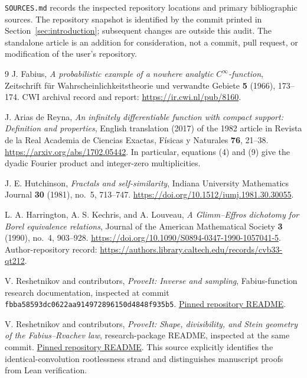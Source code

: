 \documentclass[11pt,a4paper]{article}
\theoremstyle{definition}
\theoremstyle{remark}
\newcommand{\sourcecommit}{\texttt{fbba58593dc0622aa914972896150d4848f935b5}}
\begin{document}
\texttt{SOURCES.md} records the inspected repository locations and primary
bibliographic sources. The repository snapshot is identified by the commit
printed in Section~\ref{sec:introduction}; subsequent changes are outside
this audit. The standalone article is an addition for consideration, not
a commit, pull request, or modification of the user's repository.

\begingroup
\small
\setlength{\parskip}{0pt}
\begin{thebibliography}{9}
J. Fabius,
\emph{A probabilistic example of a nowhere analytic $C^\infty$-function},
Zeitschrift f\"ur Wahrscheinlichkeitstheorie und verwandte Gebiete
\textbf{5} (1966), 173--174.
CWI archival record and report: \url{https://ir.cwi.nl/pub/8160}.

J. Arias de Reyna,
\emph{An infinitely differentiable function with compact support:
Definition and properties},
English translation (2017) of the 1982 article in
Revista de la Real Academia de Ciencias Exactas, F\'isicas y Naturales
\textbf{76}, 21--38.
\url{https://arxiv.org/abs/1702.05442}.
In particular, equations (4) and (9) give the dyadic Fourier product and
integer-zero multiplicities.

J. E. Hutchinson,
\emph{Fractals and self-similarity},
Indiana University Mathematics Journal \textbf{30} (1981), no.~5, 713--747.
\url{https://doi.org/10.1512/iumj.1981.30.30055}.

L. A. Harrington, A. S. Kechris, and A. Louveau,
\emph{A Glimm--Effros dichotomy for Borel equivalence relations},
Journal of the American Mathematical Society \textbf{3} (1990), no.~4,
903--928.
\url{https://doi.org/10.1090/S0894-0347-1990-1057041-5}.
Author-repository record:
\url{https://authors.library.caltech.edu/records/cvb33-qt212}.

V. Reshetnikov and contributors,
\emph{ProveIt: Inverse and sampling}, Fabius-function research documentation,
inspected at commit \sourcecommit.
\href{https://github.com/VladimirReshetnikov/ProveIt/blob/fbba58593dc0622aa914972896150d4848f935b5/Analysis/FabiusFunction/docs/semi-formalized-research-frontiers/drafts/inverse-and-sampling/README.md}{Pinned repository README}.

V. Reshetnikov and contributors,
\emph{ProveIt: Shape, divisibility, and Stein geometry of the Fabius--Rvachev law},
research-package README, inspected at the same commit.
\href{https://github.com/VladimirReshetnikov/ProveIt/blob/fbba58593dc0622aa914972896150d4848f935b5/Analysis/FabiusFunction/docs/semi-formalized-research-frontiers/drafts/representations/Fabius_Rvachev_Shape_Divisibility_Stein_Geometry/README.md}{Pinned repository README}.
This source explicitly identifies the identical-convolution rootlessness
strand and distinguishes manuscript proofs from Lean verification.
\end{thebibliography}
\endgroup
\end{document}
